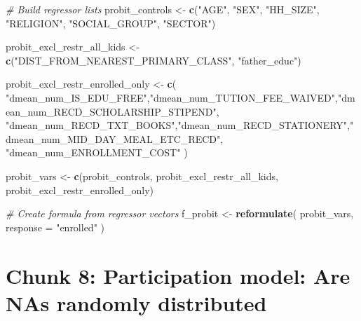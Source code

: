 \documentclass[
]{article}
\newenvironment{Shaded}{\begin{snugshade}}{\end{snugshade}}
\newcommand{\AttributeTok}[1]{\textcolor[rgb]{0.13,0.29,0.53}{#1}}
\newcommand{\CommentTok}[1]{\textcolor[rgb]{0.56,0.35,0.01}{\textit{#1}}}
\newcommand{\FunctionTok}[1]{\textcolor[rgb]{0.13,0.29,0.53}{\textbf{#1}}}
\newcommand{\NormalTok}[1]{#1}
\newcommand{\OtherTok}[1]{\textcolor[rgb]{0.56,0.35,0.01}{#1}}
\newcommand{\StringTok}[1]{\textcolor[rgb]{0.31,0.60,0.02}{#1}}
\begin{document}
\begin{Shaded}
\begin{Highlighting}[]
\CommentTok{\# Build regressor lists}
\NormalTok{probit\_controls   }\OtherTok{\textless{}{-}} \FunctionTok{c}\NormalTok{(}\StringTok{"AGE"}\NormalTok{,}
                       \StringTok{"SEX"}\NormalTok{,}
                       \StringTok{"HH\_SIZE"}\NormalTok{,}
                       \StringTok{"RELIGION"}\NormalTok{,}
                       \StringTok{"SOCIAL\_GROUP"}\NormalTok{,}
                       \StringTok{"SECTOR"}\NormalTok{)}

\NormalTok{probit\_excl\_restr\_all\_kids }\OtherTok{\textless{}{-}} \FunctionTok{c}\NormalTok{(}\StringTok{"DIST\_FROM\_NEAREST\_PRIMARY\_CLASS"}\NormalTok{,}
                       \StringTok{"father\_educ"}\NormalTok{)}

\NormalTok{probit\_excl\_restr\_enrolled\_only }\OtherTok{\textless{}{-}} \FunctionTok{c}\NormalTok{(}
  \StringTok{"dmean\_num\_IS\_EDU\_FREE"}\NormalTok{,}\StringTok{"dmean\_num\_TUTION\_FEE\_WAIVED"}\NormalTok{,}\StringTok{"dmean\_num\_RECD\_SCHOLARSHIP\_STIPEND"}\NormalTok{,}
  \StringTok{"dmean\_num\_RECD\_TXT\_BOOKS"}\NormalTok{,}\StringTok{"dmean\_num\_RECD\_STATIONERY"}\NormalTok{,}\StringTok{"dmean\_num\_MID\_DAY\_MEAL\_ETC\_RECD"}\NormalTok{,}
  \StringTok{"dmean\_num\_ENROLLMENT\_COST"}
\NormalTok{)}


\NormalTok{probit\_vars }\OtherTok{\textless{}{-}} \FunctionTok{c}\NormalTok{(probit\_controls, probit\_excl\_restr\_all\_kids, probit\_excl\_restr\_enrolled\_only)}

\CommentTok{\# Create formula from regressor vectors}
\NormalTok{f\_probit }\OtherTok{\textless{}{-}} \FunctionTok{reformulate}\NormalTok{(}
\NormalTok{  probit\_vars,}
  \AttributeTok{response =} \StringTok{"enrolled"}
\NormalTok{  )}
\end{Highlighting}
\end{Shaded}

\section*{Chunk 8: Participation model: Are NAs randomly distributed}\label{chunk-8-participation-model-are-nas-randomly-distributed}
\end{document}
